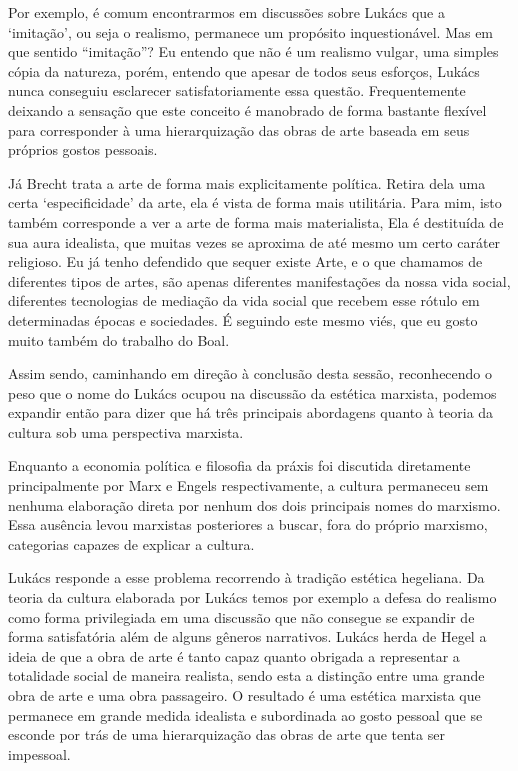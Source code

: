 Por exemplo, é comum encontrarmos em discussões sobre Lukács que a ‘imitação’, ou seja o realismo, permanece um propósito inquestionável. Mas em que sentido “imitação”? Eu entendo que não é um realismo vulgar, uma simples cópia da natureza, porém, entendo que apesar de todos seus esforços, Lukács nunca conseguiu esclarecer satisfatoriamente essa questão. Frequentemente deixando a sensação que este conceito é manobrado de forma bastante flexível para corresponder à uma hierarquização das obras de arte baseada em seus próprios gostos pessoais.

Já Brecht trata a arte de forma mais explicitamente política. Retira dela uma certa ‘especificidade’ da arte, ela é vista de forma mais utilitária. Para mim, isto também corresponde a ver a arte de forma mais materialista, Ela é destituída de sua aura idealista, que muitas vezes se aproxima de até mesmo um certo caráter religioso. Eu já tenho defendido que sequer existe Arte, e o que chamamos de diferentes tipos de artes, são apenas diferentes manifestações da nossa vida social, diferentes tecnologias de mediação da vida social que recebem esse rótulo em determinadas épocas e sociedades. É seguindo este mesmo viés, que eu gosto muito também do trabalho do Boal.

Assim sendo, caminhando em direção à conclusão desta sessão, reconhecendo o peso que o nome do Lukács ocupou na discussão da estética marxista, podemos expandir então para dizer que há três principais abordagens quanto à teoria da cultura sob uma perspectiva marxista.

Enquanto a economia política e filosofia da práxis foi discutida diretamente principalmente por Marx e Engels respectivamente,  a cultura permaneceu sem nenhuma elaboração direta por nenhum dos dois principais nomes do marxismo. Essa ausência levou marxistas posteriores a buscar, fora do próprio marxismo, categorias capazes de explicar a cultura.

Lukács responde a esse problema recorrendo à tradição estética hegeliana. Da teoria da cultura elaborada por  Lukács temos por exemplo a defesa do realismo como forma  privilegiada em uma discussão que não consegue se expandir de forma satisfatória além de alguns gêneros narrativos. Lukács herda de Hegel a ideia de que a obra de arte é tanto capaz quanto obrigada a representar a totalidade social de maneira realista, sendo esta a distinção entre uma grande obra de arte e uma obra passageiro. O resultado é uma estética marxista que permanece em grande medida idealista e subordinada ao gosto pessoal que se esconde por trás de uma hierarquização das obras de arte que tenta ser impessoal.

